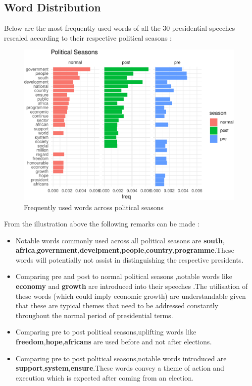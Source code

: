 \documentclass[]{article}
\begin{document}
\newpage

\subsection{Word Distribution}

Below are the most frequently used words of all the 30 presidential
speeches rescaled according to their respective political seasons :

\begin{figure}[H]

{\centering \includegraphics{datasci_fi_Assignment_2_files/figure-latex/eda_season -1} 

}

\caption{Frequently used words across political seasons}\label{fig:eda_season }
\end{figure}

From the illustration above the following remarks can be made :

\begin{itemize}
\item Notable words commonly used across all political seasons are \textbf{south}, \textbf{africa},\textbf{government},\textbf{develpment},\textbf{people},\textbf{country},\textbf{programme}.These words will potentially not assist in distinguishing the respective presidents.

\item Comparing pre and post to normal political seasons ,notable words like \textbf{economy} and \textbf{growth} are introduced into their speeches .The utilisation of these words (which could imply economic growth) are understandable given that these are typical themes that need to be addressed constantly throughout the normal period of presidential terms.

\item Comparing pre to post political seasons,uplifting words like \textbf{freedom},\textbf{hope},\textbf{africans} are used before and not after elections.

\item Comparing pre to post political seasons,notable words introduced are \textbf{support},\textbf{system},\textbf{ensure}.These words convey a theme of action and execution which is expected after coming from an election.

\end{itemize}
\end{document}
